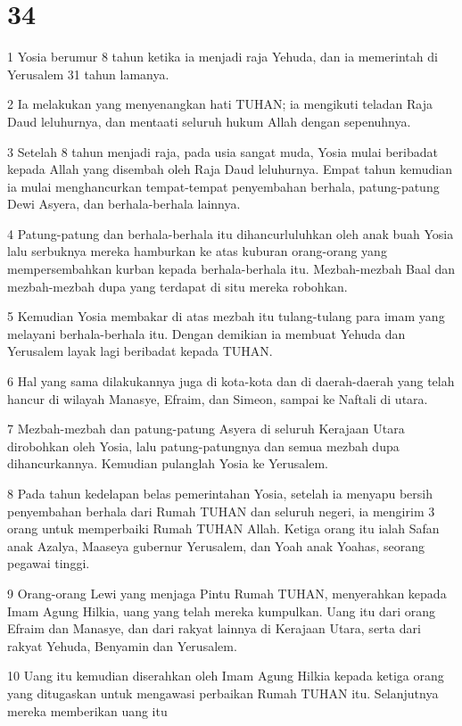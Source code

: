 \chapter{34}

\par 1 Yosia berumur 8 tahun ketika ia menjadi raja Yehuda, dan ia memerintah di Yerusalem 31 tahun lamanya.
\par 2 Ia melakukan yang menyenangkan hati TUHAN; ia mengikuti teladan Raja Daud leluhurnya, dan mentaati seluruh hukum Allah dengan sepenuhnya.
\par 3 Setelah 8 tahun menjadi raja, pada usia sangat muda, Yosia mulai beribadat kepada Allah yang disembah oleh Raja Daud leluhurnya. Empat tahun kemudian ia mulai menghancurkan tempat-tempat penyembahan berhala, patung-patung Dewi Asyera, dan berhala-berhala lainnya.
\par 4 Patung-patung dan berhala-berhala itu dihancurluluhkan oleh anak buah Yosia lalu serbuknya mereka hamburkan ke atas kuburan orang-orang yang mempersembahkan kurban kepada berhala-berhala itu. Mezbah-mezbah Baal dan mezbah-mezbah dupa yang terdapat di situ mereka robohkan.
\par 5 Kemudian Yosia membakar di atas mezbah itu tulang-tulang para imam yang melayani berhala-berhala itu. Dengan demikian ia membuat Yehuda dan Yerusalem layak lagi beribadat kepada TUHAN.
\par 6 Hal yang sama dilakukannya juga di kota-kota dan di daerah-daerah yang telah hancur di wilayah Manasye, Efraim, dan Simeon, sampai ke Naftali di utara.
\par 7 Mezbah-mezbah dan patung-patung Asyera di seluruh Kerajaan Utara dirobohkan oleh Yosia, lalu patung-patungnya dan semua mezbah dupa dihancurkannya. Kemudian pulanglah Yosia ke Yerusalem.
\par 8 Pada tahun kedelapan belas pemerintahan Yosia, setelah ia menyapu bersih penyembahan berhala dari Rumah TUHAN dan seluruh negeri, ia mengirim 3 orang untuk memperbaiki Rumah TUHAN Allah. Ketiga orang itu ialah Safan anak Azalya, Maaseya gubernur Yerusalem, dan Yoah anak Yoahas, seorang pegawai tinggi.
\par 9 Orang-orang Lewi yang menjaga Pintu Rumah TUHAN, menyerahkan kepada Imam Agung Hilkia, uang yang telah mereka kumpulkan. Uang itu dari orang Efraim dan Manasye, dan dari rakyat lainnya di Kerajaan Utara, serta dari rakyat Yehuda, Benyamin dan Yerusalem.
\par 10 Uang itu kemudian diserahkan oleh Imam Agung Hilkia kepada ketiga orang yang ditugaskan untuk mengawasi perbaikan Rumah TUHAN itu. Selanjutnya mereka memberikan uang itu
